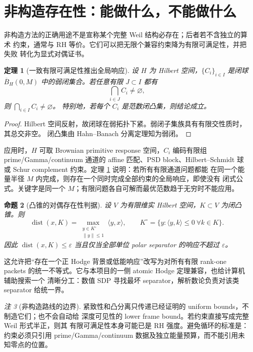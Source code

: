 \documentclass[UTF8,11pt,a4paper]{ctexart}
\newtheorem{theorem}{定理}[section]
\newtheorem{proposition}[theorem]{命题}
\theoremstyle{definition}
\theoremstyle{remark}
\newtheorem{remark}[theorem]{注}
\newcommand{\eps}{\varepsilon}
\begin{document}
\section{非构造存在性：能做什么，不能做什么}

非构造方法的正确用途不是宣称某个完整 Weil 结构必存在；后者若不含独立的算术
约束，通常与 RH 等价。它们可以把无限个兼容约束降为有限可满足性，并把失败
转化为显式对偶证书。

\begin{theorem}[一致有限可满足性推出全局响应]\label{thm:compact}
设 $H$ 为 Hilbert 空间，$\{C_i\}_{i\in I}$ 是闭球
$\overline B_H(0,M)$ 中的弱闭集合。若任意有限 $J\subset I$ 都有
\[
 \bigcap_{i\in J}C_i\ne\varnothing,
\]
则 $\bigcap_{i\in I}C_i\ne\varnothing$。
特别地，若每个 $C_i$ 是范数闭凸集，则结论成立。
\end{theorem}

\begin{proof}
Hilbert 空间反射，故闭球在弱拓扑下紧。弱闭子集族具有有限交性质时，其总交非空。
闭凸集由 Hahn--Banach 分离定理知为弱闭。
\end{proof}

应用时，$H$ 可取 Brownian primitive response 空间，$C_i$ 编码有限组
prime/Gamma/continuum 通道的 affine 匹配、PSD block、Hilbert--Schmidt 球或
Schur complement 约束。定理 \ref{thm:compact} 说明：若所有有限通道问题都能
在同一个能量半径 $M$ 内完成，则存在一个同时完成全部约束的全局响应，即使没有
闭式公式。关键字是同一个 $M$；有限问题各自可解而最优范数趋于无穷时不能应用。

\begin{proposition}[凸锥的对偶存在性判据]\label{prop:dual}
设 $V$ 为有限维实 Hilbert 空间，$K\subset V$ 为闭凸锥。则
\[
 \operatorname{dist}(x,K)
 =\max_{\substack{y\in K^\circ\\\|y\|\le1}}\langle y,x\rangle,
 \qquad
 K^\circ=\{y:\langle y,k\rangle\le0\ \forall k\in K\}.
\]
因此 $\operatorname{dist}(x,K)\le\eps$ 当且仅当全部单位 polar separator
的响应不超过 $\eps$。
\end{proposition}

这允许把“存在一个正 Hodge 背景或低能响应”改写为对所有有限 rank-one packets
的统一不等式。它与本项目的一侧 atomic Hodge 定理兼容，也给计算机辅助搜索一个
清晰分工：数值 SDP 寻找最坏 separator，解析数论负责对该类 separator 给统一界。

\begin{remark}[非构造路线的边界]
紧致性和凸分离只传递已经证明的 uniform bounds，不制造它们；也不会自动给
深度可见性的 lower frame bound。若约束直接写成完整 Weil 形式半正，则其
有限可满足性本身可能已是 RH 强度。避免循环的标准是：约束必须只引用
prime/Gamma/continuum 数据及独立能量预算，而不能引用未知零点的位置。
\end{remark}
\end{document}

